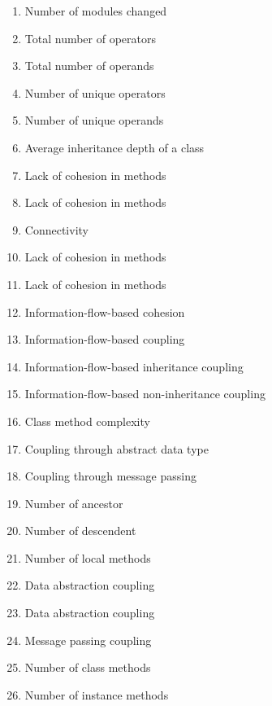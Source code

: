 \documentclass{article}
\begin{document}
{\begin{pptWide}{5}
\begin{enumerate}
  \item \textbf{} Number of modules changed
  \item \textbf{} Total number of operators
  \item \textbf{} Total number of operands
  \item \textbf{} Number of unique operators
  \item \textbf{} Number of unique operands
  \item \textbf{} Average inheritance depth of a class
  \item \textbf{} Lack of cohesion in methods
  \item \textbf{} Lack of cohesion in methods
  \item \textbf{} Connectivity
  \item \textbf{} Lack of cohesion in methods
  \item \textbf{} Lack of cohesion in methods
  \item \textbf{} Information-flow-based cohesion
  \item \textbf{} Information-flow-based coupling
  \item \textbf{} Information-flow-based inheritance coupling
  \item \textbf{} Information-flow-based non-inheritance coupling
  \item \textbf{} Class method complexity
  \item \textbf{} Coupling through abstract data type
  \item \textbf{} Coupling through message passing
  \item \textbf{} Number of ancestor
  \item \textbf{} Number of descendent
  \item \textbf{} Number of local methods
  \item \textbf{} Data abstraction coupling
  \item \textbf{} Data abstraction coupling
  \item \textbf{} Message passing coupling
  \item \textbf{} Number of class methods
  \item \textbf{} Number of instance methods

\end{enumerate}
\end{pptWide}}
\end{document}

